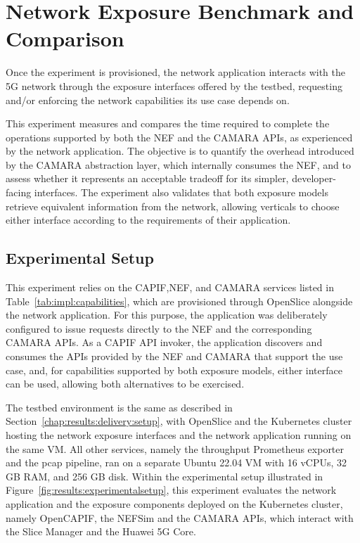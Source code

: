 \section{Network Exposure Benchmark and Comparison}
\label{chap:results:exposure}

Once the experiment is provisioned, the network application interacts with the \acs{5G} network through the exposure interfaces offered by the testbed, requesting and/or enforcing the network capabilities its use case depends on.

This experiment measures and compares the time required to complete the operations supported by both the \acs{NEF} and the CAMARA \acsp{API}, as experienced by the network application. The objective is to quantify the overhead introduced by the CAMARA abstraction layer, which internally consumes the \acs{NEF}, and to assess whether it represents an acceptable tradeoff for its simpler, developer-facing interfaces. The experiment also validates that both exposure models retrieve equivalent information from the network, allowing verticals to choose either interface according to the requirements of their application.

\subsection{Experimental Setup}
\label{chap:results:exposure:setup}

This experiment relies on the \acs{CAPIF},\acs{NEF}, and CAMARA services listed in Table~\ref{tab:impl:capabilities}, which are provisioned through OpenSlice alongside the network application. For this purpose, the application was deliberately configured to issue requests directly to the \acs{NEF} and the corresponding CAMARA \acsp{API}. As a \acs{CAPIF} \acs{API} invoker, the application discovers and consumes the \acsp{API} provided by the \acs{NEF} and CAMARA that support the use case, and, for capabilities supported by both exposure models, either interface can be used, allowing both alternatives to be exercised.

The testbed environment is the same as described in Section~\ref{chap:results:delivery:setup}, with OpenSlice and the Kubernetes cluster hosting the network exposure interfaces and the network application running on the same \acs{VM}. All other services, namely the throughput Prometheus exporter and the pcap pipeline, ran on a separate Ubuntu 22.04 \acs{VM} with 16 vCPUs, 32 GB \acs{RAM}, and 256 GB disk. Within the experimental setup illustrated in Figure~\ref{fig:results:experimentalsetup}, this experiment evaluates the network application and the exposure components deployed on the Kubernetes cluster, namely Open\acs{CAPIF}, the \acs{NEF}Sim and the CAMARA \acsp{API}, which interact with the Slice Manager and the Huawei \acs{5G} Core.

